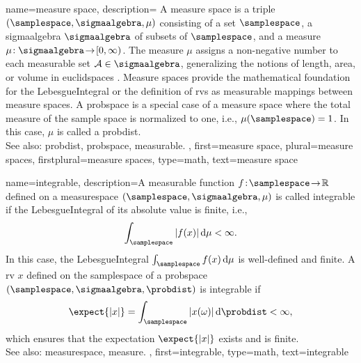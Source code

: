 {name={measure space},
 description={
        A measure space is a triple $(\samplespace, \sigmaalgebra, \mu)$ consisting of 
        a set $\samplespace$, a \gls{sigmaalgebra} $\sigmaalgebra$ of subsets 
		of $\samplespace$, and a measure $\mu\!:\sigmaalgebra\!\to\![0,\infty)$. 
        The measure $\mu$ assigns a non-negative number to each \gls{measurable} 
		set $\mathcal{A} \in \sigmaalgebra$, generalizing the 
		notions of length, area, or volume in \glspl{euclidspace} \cite{RudinBookPrinciplesMatheAnalysis,HalmosMeasure}. 
		Measure spaces provide the mathematical foundation for the 
		\gls{LebesgueIntegral} or the definition of \glspl{rv} as measurable mappings 
        between measure spaces.  
        A \gls{probspace} is a special case of a measure space 
		where the total measure of the sample space is normalized to one, 
        i.e., $\mu(\samplespace) = 1$. In this case, $\mu$ is called a \gls{probdist}.\\ 
		See also: \gls{probdist}, \gls{probspace}, \gls{measurable}.  
    },
    first={measure space},
	plural={measure spaces}, 
	firstplural={measure spaces}, 
	type=math, 
    text={measure space}
}

{name={integrable},
	description={A \gls{measurable} \gls{function} $f\!:\!\samplespace \!\to\! \mathbb{R}$ 
				 defined on a \gls{measurespace} $(\samplespace, \sigmaalgebra, \mu)$ 
				is called integrable if the \gls{LebesgueIntegral} 
				of its absolute value is finite, i.e.,
				\[
				\int_{\samplespace} |f(x)|\,\mathrm{d}\mu < \infty.
				\]
				In this case, the \gls{LebesgueIntegral} $\int_{\samplespace} f(x)\,\mathrm{d}\mu$ 
				is well-defined and finite. A \gls{rv} $x$ defined on the \gls{samplespace} 
				of a \gls{probspace} $(\samplespace, \sigmaalgebra, \probdist)$ 
				is integrable if 
				\[
				\expect\{|x|\}
				= \int_{\samplespace} |x(\omega)|\,\mathrm{d}\probdist 
				< \infty,
				\]
				which ensures that the \gls{expectation} $\expect\{|x|\}$ 
				exists and is finite. 
				\\ 
				See also: \gls{measurespace}, \gls{measure}.
				},
first={integrable},
type=math, 
text={integrable}
}

